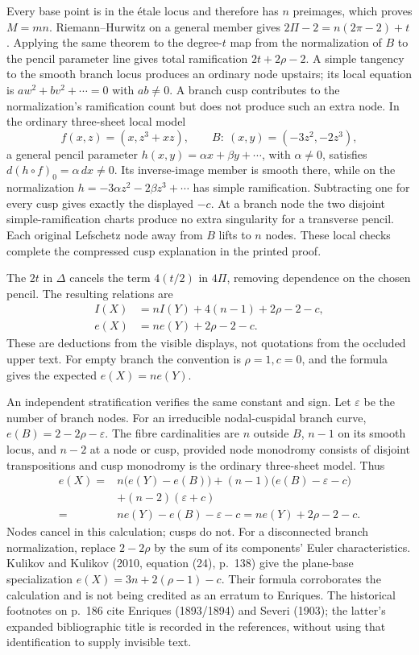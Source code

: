 Every base point is in the étale locus and therefore has \(n\) preimages, which proves \(M=mn\). Riemann--Hurwitz on a general member gives \(2\Pi-2=n(2\pi-2)+t\). Applying the same theorem to the degree-\(t\) map from the normalization of \(B\) to the pencil parameter line gives total ramification \(2t+2\rho-2\). A simple tangency to the smooth branch locus produces an ordinary node upstairs; its local equation is \(aw^2+bv^2+\cdots=0\) with \(ab\ne0\). A branch cusp contributes to the normalization's ramification count but does not produce such an extra node. In the ordinary three-sheet local model \[
f(x,z)=(x,z^3+xz),\qquad
B:\ (x,y)=(-3z^2,-2z^3),
\] a general pencil parameter \(h(x,y)=\alpha x+\beta y+\cdots\), with \(\alpha\ne0\), satisfies \(d(h\circ f)_0=\alpha\,dx\ne0\). Its inverse-image member is smooth there, while on the normalization \(h=-3\alpha z^2-2\beta z^3+\cdots\) has simple ramification. Subtracting one for every cusp gives exactly the displayed \(-c\). At a branch node the two disjoint simple-ramification charts produce no extra singularity for a transverse pencil. Each original Lefschetz node away from \(B\) lifts to \(n\) nodes. These local checks complete the compressed cusp explanation in the printed proof.

The \(2t\) in \(\Delta\) cancels the term \(4(t/2)\) in \(4\Pi\), removing dependence on the chosen pencil. The resulting relations are \[
\begin{aligned}
I(X)&=nI(Y)+4(n-1)+2\rho-2-c,\\
e(X)&=ne(Y)+2\rho-2-c.
\end{aligned}\tag{V.8.2}
\] These are deductions from the visible displays, not quotations from the occluded upper text. For empty branch the convention is \(\rho=1,c=0\), and the formula gives the expected \(e(X)=ne(Y)\).

An independent stratification verifies the same constant and sign. Let \(\varepsilon\) be the number of branch nodes. For an irreducible nodal-cuspidal branch curve, \(e(B)=2-2\rho-\varepsilon\). The fibre cardinalities are \(n\) outside \(B\), \(n-1\) on its smooth locus, and \(n-2\) at a node or cusp, provided node monodromy consists of disjoint transpositions and cusp monodromy is the ordinary three-sheet model. Thus \[
\begin{aligned}
e(X)={}&n\bigl(e(Y)-e(B)\bigr)
 +(n-1)\bigl(e(B)-\varepsilon-c\bigr)\\
 &+(n-2)(\varepsilon+c)\\
={}&ne(Y)-e(B)-\varepsilon-c
 =ne(Y)+2\rho-2-c.
\end{aligned}
\] Nodes cancel in this calculation; cusps do not. For a disconnected branch normalization, replace \(2-2\rho\) by the sum of its components' Euler characteristics. Kulikov and Kulikov (2010, equation (24), p.~138) give the plane-base specialization \(e(X)=3n+2(\rho-1)-c\). Their formula corroborates the calculation and is not being credited as an erratum to Enriques. The historical footnotes on p.~186 cite Enriques (1893/1894) and Severi (1903); the latter's expanded bibliographic title is recorded in the references, without using that identification to supply invisible text.

